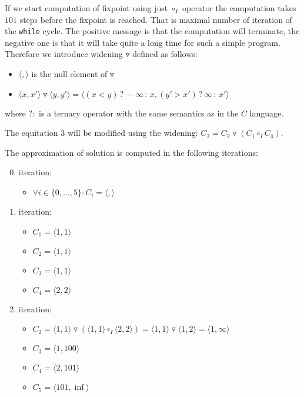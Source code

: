 \documentclass[a4paper, 12pt]{article}
\newcommand{\interval}[2]{\langle #1,#2 \rangle}
\newcommand{\ajoin}[0]{\circ}
\newcommand{\wid}[0]{\triangledown}
\newcommand{\iintg}[0]{I}
\newcommand{\ijoin}[0]{\ajoin_\iintg}
\begin{document}
If we start computation of fixpoint using just $\ijoin$ operator the computation takes $101$ steps
before the fixpoint is reached.
That is maximal number of iteration of the \texttt{while} cycle.
The positive message is that the computation will terminate, the negative one
is that it will take quite a long time for such a simple program.
Therefore we introduce widening $\wid$ defined as follows:
\begin{itemize}
	\item $\interval{}{}$ is the null element of $\wid$
	\item $\interval{x}{x'} \wid \interval{y}{y'} = \interval{(x < y)\,?\,-\infty\,:\,x}{(y' > x')\,?\,\infty\,:\,x'}$
\end{itemize}
where $?:$ is a ternary operator with the same semantics as in the $C$ language.

The equitation $3$ will be modified using the widening:
$C_2 = C_2 \wid (C_1 \ijoin C_4)$.

The approximation of solution is computed in the following iterations:
\begin{enumerate}
	\setcounter{enumi}{-1}
	\item \hspace{-0.5em} iteration:
		\begin{itemize}
			\item $\forall i \in \{0,\ldots,5\}: C_i = \interval{}{}$
		\end{itemize}
	
	\item \hspace{-0.5em} iteration:
		\begin{itemize}
			\item $C_1 = \interval{1}{1}$
			\item $C_2 = \interval{1}{1}$
			\item $C_3 = \interval{1}{1}$
			\item $C_4 = \interval{2}{2}$
		\end{itemize}
	
	\item \hspace{-0.5em} iteration:
		\begin{itemize}
			\item $C_2 = \interval{1}{1} \wid (\interval{1}{1} \ijoin \interval{2}{2})
		               = \interval{1}{1} \wid \interval{1}{2} = \interval{1}{\infty}$
			\item $C_3 = \interval{1}{100}$
			\item $C_4 = \interval{2}{101}$
			\item $C_5 = \interval{101}{\inf}$
		\end{itemize}
\end{enumerate}
\end{document}
